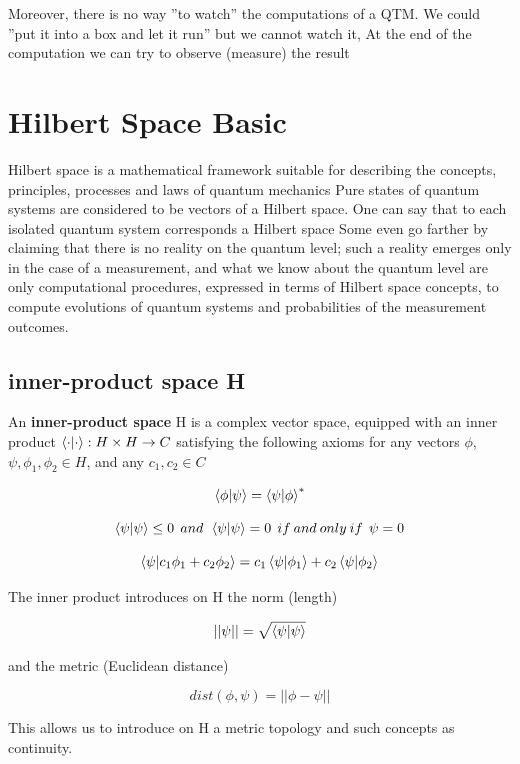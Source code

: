 \documentclass[12pt]{book}
\begin{document}
Moreover, there is no way ''to watch'' the computations of a QTM. We could ''put it into a box and let it run'' but we cannot watch it, At the end of the computation we can try to observe (measure) the result




\section{Hilbert Space Basic}

Hilbert space is a mathematical framework suitable for describing the concepts,  principles,  processes and laws of quantum mechanics Pure states of quantum systems are considered to be vectors of a Hilbert space. One can say that to each isolated quantum system corresponds a Hilbert space Some even go farther by claiming that there is no reality on the quantum level; such a reality emerges only in the case of a measurement, and what we know about the quantum level are only computational procedures, expressed in terms of Hilbert space concepts,  to compute evolutions of quantum systems and probabilities of the measurement outcomes.


\subsection{inner-product space H}

An \textbf{inner-product space} H is a complex vector space, equipped with an inner product
$ \bra{\cdot}\ket{\cdot} : H \times H \to C$
satisfying the following axioms for any vectors $\phi$, $\psi, \phi_{1}, \phi_{2} \in H$, and any  $c_{1}, c_{2} \in C$


$$
\bra{\phi}\ket{\psi} = \bra{\psi}\ket{\phi}^{*}
$$

$$
\bra{\psi}\ket{\psi} \leq 0 \:\: and  \:\:
\bra{\psi}\ket{\psi} = 0 \:\: if\: and\: only\: if \:\:
\psi = 0
$$

$$
\bra{\psi}\ket{c_{1}\phi_{1} + c_{2}\phi_{2}} = c_{1}\bra{\psi}\ket{\phi_{1}} + c_{2}\bra{\psi}\ket{\phi_{2}}
$$

The inner product introduces on H the norm (length)

$$
||\psi|| = \sqrt{\bra{\psi}\ket{\psi}}
$$

and the metric (Euclidean distance)

$$
dist(\phi,\psi) = || \phi - \psi ||
$$

This allows us to introduce on H a metric topology and such concepts as continuity.
\end{document}
